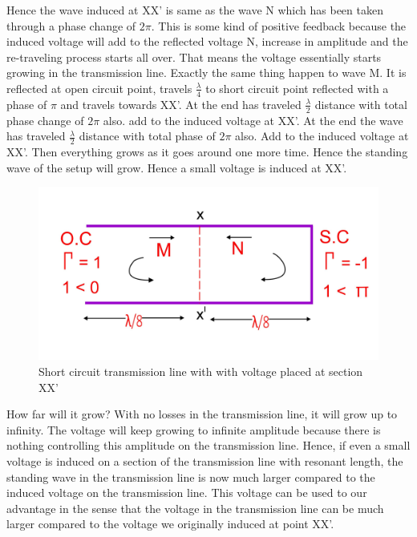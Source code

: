 Hence  the  wave induced at XX' is same as the  wave N which has been taken through  a phase change  of $2\pi$. This is some kind of positive feedback because  the induced  voltage  will add to the  reflected  voltage N, increase in amplitude  and the re-traveling process  starts all over. That means  the voltage essentially  starts growing  in  the transmission line. Exactly the same  thing  happen to  wave M. It is reflected  at open circuit point, travels $\frac{\lambda}{4}$ to short circuit  point  reflected with a phase of $\pi$  and travels  towards XX'. At the end has traveled $\frac{\lambda }{2}$  distance  with total phase change of $2\pi$ also. add to the induced  voltage  at XX'. At the end the wave has traveled $\frac{\lambda}{2}$ distance with total phase of $2\pi$ also. Add to the induced voltage at XX'. Then everything  grows as it goes around one more time.  Hence the standing wave of the setup will grow.  Hence a small  voltage is induced at XX'.   
\begin{figure}[h]
\centering
\includegraphics[width=1\linewidth]{./graphics/fig6}
\caption{Short circuit transmission line with with voltage placed at section XX'}
\end{figure}

How far will it grow? With no losses in the transmission line, it will grow up to infinity. The voltage will keep growing to infinite amplitude because there is nothing  controlling this amplitude  on the transmission line. Hence, if even a small voltage is induced on a section  of the transmission line with resonant length, the standing wave in the transmission line is now much larger compared to the induced voltage on the transmission line. This voltage can be used to our advantage in the sense that the voltage  in the transmission line  can be much larger compared to the voltage we originally induced at point XX'.

